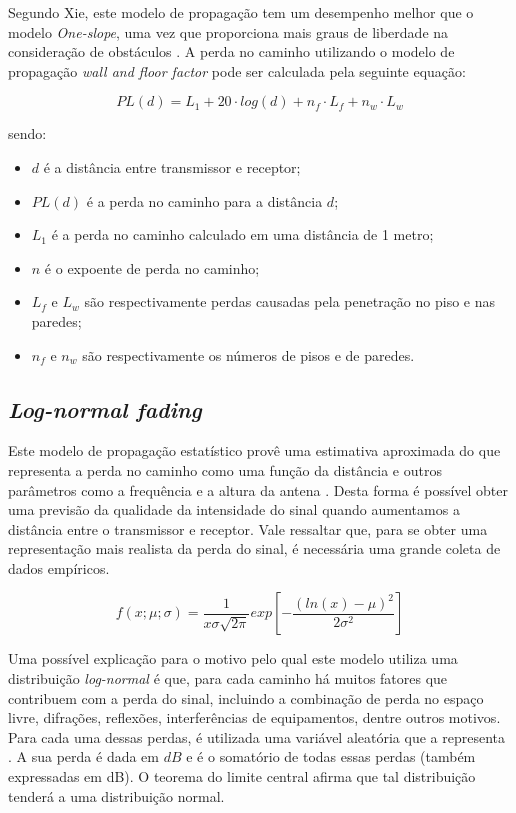 \documentclass[
	12pt,				%
	twoside,			%
	a4paper,			%
	english,			%
	french,				%
	spanish,			%
	brazil				%
	]{abntex2}
\begin{document}
Segundo Xie, este modelo de propagação tem um desempenho melhor que o
modelo \emph{One-slope}, uma vez que proporciona mais graus de liberdade
na consideração de obstáculos \cite{XIE}. A perda no caminho utilizando
o modelo de propagação \emph{wall and floor factor} pode ser calculada
pela seguinte equação:

\begin{equation}
    PL(d) = L_{1} + 20 \cdot log(d) + n_{f} \cdot L_{f} + n_{w} \cdot L_{w}
\end{equation}

sendo:

\begin{itemize}
\item
  \(d\) é a distância entre transmissor e receptor;
\item
  \(PL(d)\) é a perda no caminho para a distância \(d\);
\item
  \(L_{1}\) é a perda no caminho calculado em uma distância de 1 metro;
\item
  \(n\) é o expoente de perda no caminho;
\item
  \(L_{f}\) e \(L_{w}\) são respectivamente perdas causadas pela
  penetração no piso e nas paredes;
\item
  \(n_{f}\) e \(n_{w}\) são respectivamente os números de pisos e de
  paredes.
\end{itemize}

\subsection{\texorpdfstring{\emph{Log-normal
fading}}{Log-normal fading}}\label{sec:log_normal_fading}

Este modelo de propagação estatístico provê uma estimativa aproximada do
que representa a perda no caminho como uma função da distância e outros
parâmetros como a frequência e a altura da antena \cite{BUDGETS}. Desta
forma é possível obter uma previsão da qualidade da intensidade do sinal
quando aumentamos a distância entre o transmissor e receptor. Vale
ressaltar que, para se obter uma representação mais realista da perda do
sinal, é necessária uma grande coleta de dados empíricos.

\begin{equation}
    f(x; \mu; \sigma) = \frac{1}{x \sigma \sqrt{2 \pi}} exp[-\frac{(ln(x) - \mu)^{2}}{2 \sigma^{2}}]
\end{equation}

Uma possível explicação para o motivo pelo qual este modelo utiliza uma
distribuição \emph{log-normal} é que, para cada caminho há muitos
fatores que contribuem com a perda do sinal, incluindo a combinação de
perda no espaço livre, difrações, reflexões, interferências de
equipamentos, dentre outros motivos. Para cada uma dessas perdas, é
utilizada uma variável aleatória que a representa \cite{BUDGETS}. A sua
perda é dada em \(dB\) e é o somatório de todas essas perdas (também
expressadas em dB). O teorema do limite central afirma que tal
distribuição tenderá a uma distribuição normal.
\end{document}
